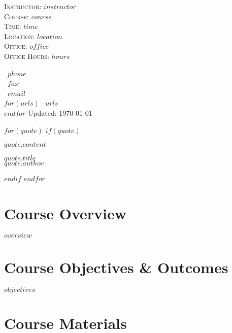 \documentclass[$fontsize$, letterpaper]{article}
\begin{document}

\begin{minipage}[t]{2.95in}
 \flushleft \footnotesize \textsc{Instructor:} $instructor$\\ \textsc{Course:}
 $course$\\ \textsc{Time:} $time$\\ \textsc{Location:} $location$\\
 \textsc{Office:} $office$\\ \textsc{Office Hours:} $hours$
\end{minipage}
\hfill
\hfill
\begin{minipage}[t]{1.7in}
  \flushright \footnotesize {} ~$phone$\\ \Faxmachine ~$fax$\\  ~$email$\\ $for(urls)$  ~$urls$\\ $endfor$
  Updated: \today
\end{minipage}

\bigskip


$for(quote)$
$if(quote)$
\bigskip
\epigraph{$quote.content$}{$quote.title$\\\textsc{$quote.author$}}
\smallskip
$endif$
$endfor$

\section*{Course Overview}

$overview$

\section*{Course Objectives \& Outcomes}

$objectives$

\section*{Course Materials}
\end{document}
